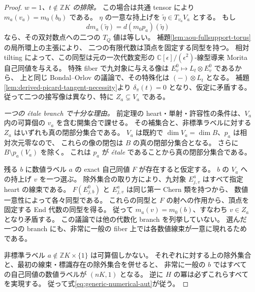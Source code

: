 \begin{proof}
\emph{$w=1$、$t\notin\mathbb ZK$ の排除。}
この場合は共通 tensor により $m_a(v_a)=m_0(b_0)$ である。
$\eta$ の一意な持上げを $\widetilde\eta\in T_{v_a}V_a$ とする。
もし
\[
 d m_a(\widetilde\eta)=d(m_0p_a)(\widetilde\eta)
\]
なら、その双対数点への二つの $T_Q$ 値は等しい。
補題\ref{lem:aou-fullsupport-torus}の局所環上の主張により、
二つの有限代数は頂点を固定する同型を持つ。
相対 tilting によって、この同型は元の一次代数変形の
$\mathbb C[\epsilon]/(\epsilon^2)$-線型導来 Morita 自己同値を与える。
特殊 fiber で九対象に与える像は $E_v^0\mapsto L_t\otimes E_v^0$ であるから、
上と同じ Bondal--Orlov の議論で、その特殊化は $(-)\otimes L_t$ となる。
補題\ref{lem:derived-picard-tangent-necessity}より $\delta_\pi(t)=0$ となり、仮定に矛盾する。
従って二つの接写像は異なり、特に $Z_a\subsetneq V_a$ である。

\emph{一つの \textit{\'etale} branch で十分な理由。}
前定理の heart・単射・許容性の条件は、$V_a$ 内の可算個の
$v_a$ を含む開集合で課せる。
その補集合と、非標準ラベルに対する $Z_a$ はいずれも真の閉部分集合である。
$V_a$ は既約で $\dim V_a=\dim B$、$p_a$ は相対次元零なので、
これらの像の閉包は $B$ の真の閉部分集合となる。
さらに $B\setminus p_a(V_a)$ を除く。
これは $p_a$ が \textit{\'etale} であることから真の閉部分集合である。

残る $b$ に数値ラベル $a$ の exact 自己同値 $F$ が存在すると仮定する。
$b$ の $V_a$ への持上げ $v$ を一つ選ぶ。
除外集合の取り方により、九対象 $E^a_{j,v}$ はすべて指定 heart の線束である。
$F(E^0_{j,b})$ と $E^a_{j,v}$ は同じ第一 Chern 類を持つから、
数値一意性によって各々同型である。
これらの同型と $F$ の射への作用から、頂点を固定する End 代数の同型を得る。
従って $m_a(v)=m_0(b)$、すなわち $v\in Z_a$ となり矛盾する。
この議論では他の代数化 branch を列挙していない。
選んだ一つの branch にも、非常に一般の fiber 上では各数値線束が一意に現れるためである。

非標準ラベル $a\notin\mathbb ZK\times\{1\}$ は可算個しかない。
それぞれに対する上の除外集合と、最初の線束・標識存在の除外集合を併せると、
非常に一般の $b$ ではすべての自己同値の数値ラベルが $(nK,1)$ となる。
逆に $H$ の冪は必ずこれらすべてを実現する。
従って式\eqref{eq:generic-numerical-aut}が従う。
\end{proof}

